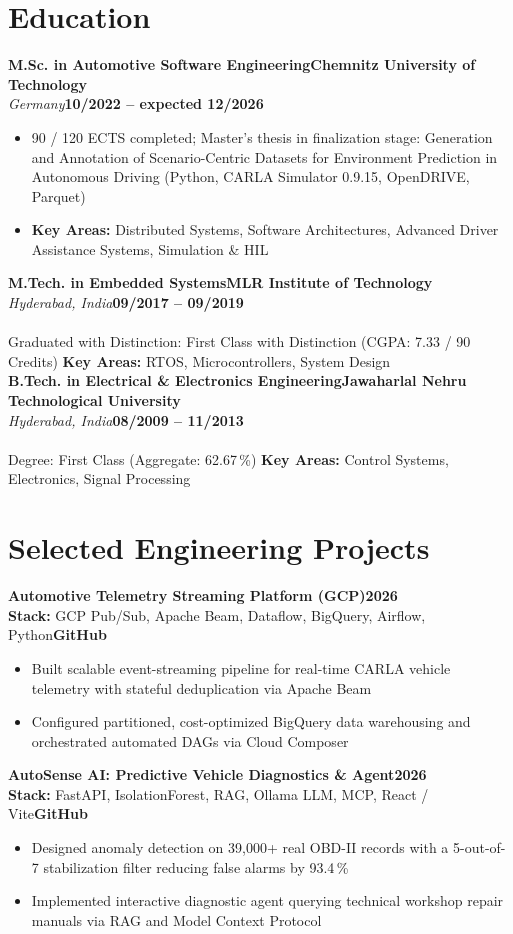 \documentclass[10pt,a4paper]{article}
\newcommand{\educationitem}[4]{%
  \noindent\textbf{#1}\hfill\textbf{#2}\\[0.02em]
  {\footnotesize\textit{\color{accent} #3}}\hfill{\footnotesize\textbf{#4}}\\[0.04em]
}
\newcommand{\projectitem}[4]{%
  \noindent\textbf{#1}\hfill{\footnotesize\textbf{#2}}\\[0.02em]
  {\scriptsize\color{subtext}\textbf{Stack:} #3}\hfill{\scriptsize\textbf{#4}}\\[0.06em]
}
\newcommand{\cvliststart}{%
  \begin{itemize}[leftmargin=1.15em,labelsep=0.38em,topsep=0.04em,itemsep=0.04em,parsep=0pt,partopsep=0pt]
}
\newcommand{\cvlistend}{\end{itemize}\vspace{0.14em}}
\begin{document}
\newpage

\section{Education}

\educationitem{M.Sc. in Automotive Software Engineering}{Chemnitz University of Technology}{Germany}{10/2022 – expected 12/2026}
\cvliststart
  \item 90 / 120 ECTS completed; Master's thesis in finalization stage: Generation and Annotation of Scenario-Centric Datasets for Environment Prediction in Autonomous Driving (Python, CARLA Simulator 0.9.15, OpenDRIVE, Parquet)
  \item \textbf{Key Areas:} Distributed Systems, Software Architectures, Advanced Driver Assistance Systems, Simulation \& HIL
\cvlistend

\educationitem{M.Tech. in Embedded Systems}{MLR Institute of Technology}{Hyderabad, India}{09/2017 – 09/2019}\\[-0.05em]
{\footnotesize Graduated with Distinction: First Class with Distinction (CGPA: 7.33 / 90 Credits) \enspace\textbar\enspace \textbf{Key Areas:} RTOS, Microcontrollers, System Design}\\[0.20em]

\educationitem{B.Tech. in Electrical \& Electronics Engineering}{Jawaharlal Nehru Technological University}{Hyderabad, India}{08/2009 – 11/2013}\\[-0.05em]
{\footnotesize Degree: First Class (Aggregate: 62.67\,\%) \enspace\textbar\enspace \textbf{Key Areas:} Control Systems, Electronics, Signal Processing}\\[0.25em]

\section{Selected Engineering Projects}

\projectitem{Automotive Telemetry Streaming Platform (GCP)}{2026}{GCP Pub/Sub, Apache Beam, Dataflow, BigQuery, Airflow, Python}{GitHub}
\cvliststart
  \item Built scalable event-streaming pipeline for real-time CARLA vehicle telemetry with stateful deduplication via Apache Beam
  \item Configured partitioned, cost-optimized BigQuery data warehousing and orchestrated automated DAGs via Cloud Composer
\cvlistend

\projectitem{AutoSense AI: Predictive Vehicle Diagnostics \& Agent}{2026}{FastAPI, IsolationForest, RAG, Ollama LLM, MCP, React / Vite}{GitHub}
\cvliststart
  \item Designed anomaly detection on 39,000+ real OBD-II records with a 5-out-of-7 stabilization filter reducing false alarms by 93.4\,\%
  \item Implemented interactive diagnostic agent querying technical workshop repair manuals via RAG and Model Context Protocol
\cvlistend
\end{document}
